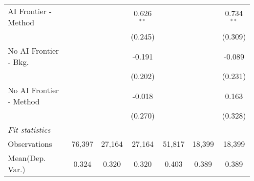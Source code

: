 \begin{tabular}{lcccccc}
   AI Frontier - Method    &               &               & 0.626$^{**}$  &               &              & 0.734$^{**}$\\   
                           &               &               & (0.245)       &               &              & (0.309)\\   
   No AI Frontier - Bkg.   &               &               & -0.191        &               &              & -0.089\\   
                           &               &               & (0.202)       &               &              & (0.231)\\   
   No AI Frontier - Method &               &               & -0.018        &               &              & 0.163\\   
                           &               &               & (0.270)       &               &              & (0.328)\\   
   \midrule
   \emph{Fit statistics}\\
   Observations            & 76,397        & 27,164        & 27,164        & 51,817        & 18,399       & 18,399\\  
Mean(Dep. Var.) & 0.324 & 0.320 & 0.320 & 0.403 & 0.389 & 0.389 \\
   

\end{tabular}
